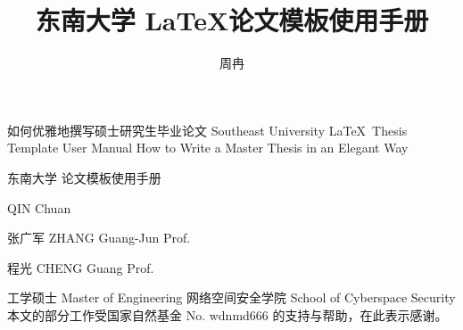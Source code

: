 \documentclass[algorithmlist,figurelist,tablelist,nomlist]{seumasterthesis}
\begin{document}

\title
{东南大学 \LaTeX 论文模板使用手册}                                      %
{如何优雅地撰写硕士研究生毕业论文}                                          %
{Southeast University \LaTeX ~Thesis Template User Manual}  %
{How to Write a Master Thesis in an Elegant Way}            %

\spine
{东南大学  论文模板使用手册}      %
{}                                                          %

\author
{周冉}                        %
{QIN Chuan}                 %

\advisor
{张广军}                       %
{ZHANG Guang-Jun}           %
{Prof.}                     %

\coadvisor
{程光}                        %
{CHENG Guang}               %
{Prof.}                     %

\degreetype                     %
{工学硕士}
{Master of Engineering}
\department                     %
{网络空间安全学院}
{School of Cyberspace Security}
\seuthesisthanks                %
{本文的部分工作受国家自然基金 No. wdnmd666 的支持与帮助，在此表示感谢。}
\end{document}
